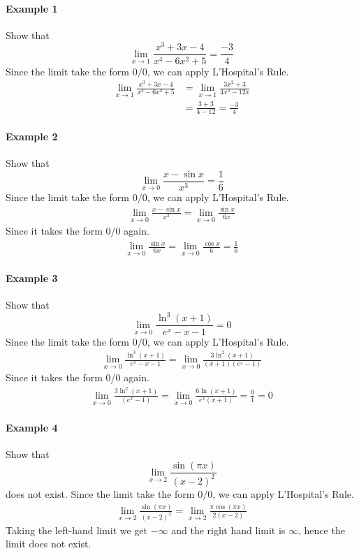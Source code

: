 \documentclass[12pt]{article}
\begin{document}
\paragraph{Example 1} Show that
\[
    \lim_{x \to 1} \frac{x^3 + 3x - 4}{x^4 - 6x^2 + 5} = \frac{ -3}{4} 
\]
Since the limit take the form $0/0$, we can apply L'Hospital's Rule.
\begin{align*} 
    \lim_{x \to 1} \frac{x^3 + 3x - 4}{x^4 - 6x^2 + 5} &= \lim_{x \to 1} \frac{3x^2 + 3}{4x^3 - 12x} \\
    &= \frac{3 + 3}{4 - 12} =  \frac{ -3}{4} 
\end{align*}

\paragraph{Example 2} Show that
\[
    \lim_{x \to 0} \frac{x - \sin x}{x^3} = \frac{1}{6} 
\]
Since the limit take the form $0/0$, we can apply L'Hospital's Rule.
\begin{align*} 
    \lim_{x \to 0} \frac{x - \sin x}{x^3} = \lim_{x \to 0} \frac{\sin x}{6x} 
\end{align*}
Since it takes the form 0/0 again.
\begin{align*} 
    \lim_{x \to 0} \frac{\sin x}{6x} = \lim_{x \to 0} \frac{\cos x}{6} = \frac{1}{6} 
\end{align*}

\paragraph{Example 3} Show that
\[
    \lim_{x \to 0} \frac{\ln^3 (x + 1)}{e^x - x - 1} = 0 
\]
Since the limit take the form $0/0$, we can apply L'Hospital's Rule.
\begin{align*} 
    \lim_{x \to 0} \frac{\ln^3 (x + 1)}{e^x - x - 1} = \lim_{x \to 0} \frac{3 \ln^2(x + 1)}{(x + 1)(e^x - 1)} 
\end{align*}
Since it takes the form 0/0 again.
\begin{align*} 
    \lim_{x \to 0} \frac{3 \ln^2(x + 1)}{(e^x - 1)} = \lim_{x \to 0} \frac{6 \ln(x + 1)}{e^x (x + 1)}  = \frac{0}{1} = 0
\end{align*}

\paragraph{Example 4} Show that
\[
    \lim_{x \to 2} \frac{\sin (\pi x)}{(x - 2)^2} 
\]
does not exist.
Since the limit take the form $0/0$, we can apply L'Hospital's Rule.
\begin{align*} 
    \lim_{x \to 2} \frac{\sin (\pi x)}{(x - 2)^2} = \lim_{x \to 2} \frac{\pi \cos(\pi x)}{2(x - 2)} 
\end{align*}
Taking the left-hand limit we get $-\infty$ and the right hand limit is $\infty$, hence the limit does not exist.
\end{document}
